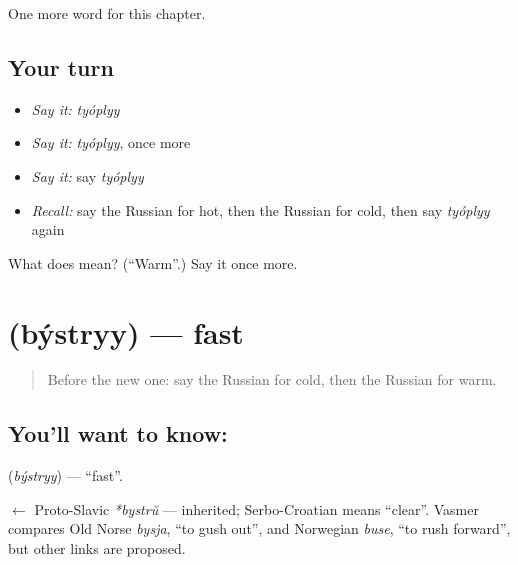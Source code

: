\begin{grammarlens}[title={What you've built}]
One more word for this chapter.
\end{grammarlens}

\subsection*{Your turn}
\begin{itemize}
\raggedright
  \item \emph{Say it:} \emph{tyóplyy}
  \item \emph{Say it:} \emph{tyóplyy}, once more
  \item \emph{Say it:} say \emph{tyóplyy}
  \item \emph{Recall:} say the Russian for hot, then the Russian for cold, then say \emph{tyóplyy} again
\end{itemize}

\begin{tcolorbox}[breakable,colback=teal!4,colframe=teal!35!black,title={Before you move on}]
What does  mean? (\textquotedblleft{}Warm\textquotedblright{}.) Say it once more.
\end{tcolorbox}
\section[\texorpdfstring{\ru{быстрый} (býstryy)}{быстрый (býstryy)}]{ (býstryy) — fast}

\label{lesson:RU-C66-fast}



\begin{quote}
Before the new one: say the Russian for cold, then the Russian for warm.
\end{quote}

\subsection*{You'll want to know: }
\textbf{} (\emph{býstryy}) — \textquotedblleft{}fast\textquotedblright{}.

\begin{cousinweb}
\textbf{} $\leftarrow$ Proto-Slavic \emph{*bystrŭ} — inherited; Serbo-Croatian \emph{} means \textquotedblleft{}clear\textquotedblright{}. Vasmer compares Old Norse \emph{bysja}, \textquotedblleft{}to gush out\textquotedblright{}, and Norwegian \emph{buse}, \textquotedblleft{}to rush forward\textquotedblright{}, but other links are proposed.
\end{cousinweb}

